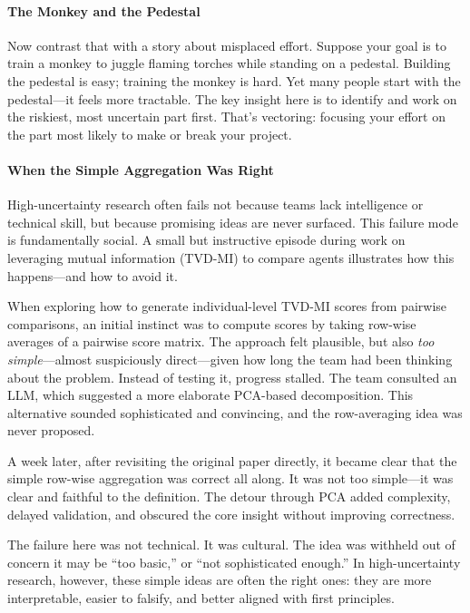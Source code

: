 \paragraph{The Monkey and the Pedestal}
Now contrast that with a story about misplaced effort.
Suppose your goal is to train a monkey to juggle flaming torches while standing on a pedestal.
Building the pedestal is easy; training the monkey is hard.
Yet many people start with the pedestal---it feels more tractable.
The key insight here is to identify and work on the riskiest, most uncertain part first.
That's vectoring: focusing your effort on the part most likely to make or break your project.

\paragraph{When the Simple Aggregation Was Right}
High-uncertainty research often fails not because teams lack intelligence or
technical skill, but because promising ideas are never surfaced.
This failure mode is fundamentally social.
A small but instructive episode during work on
leveraging mutual information (TVD-MI) to compare agents illustrates how this
happens---and how to avoid it.

When exploring how to generate individual-level TVD-MI scores from pairwise
comparisons, an initial instinct was to compute scores by taking row-wise
averages of a pairwise score matrix.
The approach felt plausible, but also
\emph{too simple}---almost suspiciously direct---given how long the team had been
thinking about the problem.
Instead of testing it, progress stalled.
The team consulted an LLM, which suggested a more elaborate PCA-based
decomposition.
This alternative sounded sophisticated and convincing, and the
row-averaging idea was never proposed.

A week later, after revisiting the original paper directly, it became clear that the simple row-wise aggregation was correct all along.
It was not too simple---it was clear and faithful to the definition.
The detour through PCA added complexity, delayed validation, and obscured the core insight without improving correctness.

The failure here was not technical.
It was cultural.
The idea was withheld out of concern it may be ``too basic,'' or ``not sophisticated enough.''
In high-uncertainty research, however, these simple ideas are often the right ones: they are more interpretable, easier to falsify, and better aligned with first principles.


